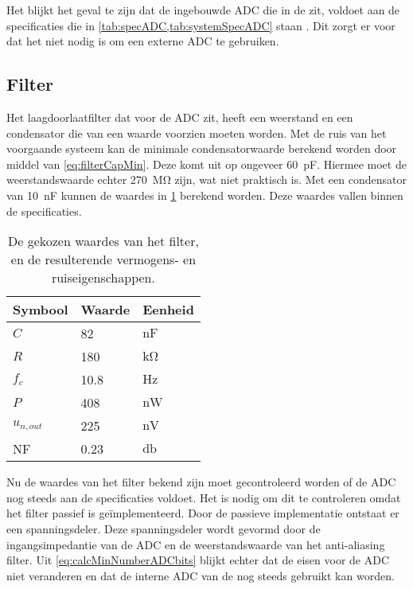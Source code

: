 Het blijkt het geval te zijn dat de ingebouwde ADC die in de \mcu  zit, voldoet aan de specificaties die in \cref{tab:specADC,tab:systemSpecADC} staan \cite{nrf52810}. Dit zorgt er voor dat het niet nodig is om een externe ADC te gebruiken.

\subsection{Filter}
Het laagdoorlaatfilter dat voor de ADC zit, heeft een weerstand en een condensator die van een waarde voorzien moeten worden.
Met de ruis van het voorgaande systeem kan de minimale condensatorwaarde berekend worden door middel van \cref{eq:filterCapMin}. Deze komt uit op ongeveer \qty{60}{\pico\farad}. Hiermee moet de weerstandswaarde echter \qty{270}{\mega\ohm} zijn, wat niet praktisch is. Met een condensator van \qty{10}{\nano\farad} kunnen de waardes in \cref{tab:filterValues} berekend worden. Deze waardes vallen binnen de specificaties.

\begin{table}[!htbp]
    \centering
    \begin{tabular}{l|l|l}
        Symbool & Waarde & Eenheid \\
        \hline
        $C$         & 82    & $\si{\nano\farad}$\\
        $R$         & 180   & $\si{\kilo\ohm}$  \\
        $f_c$       & 10.8  & $\si{\hertz}$     \\
        $P$         & 408   & $\si{\nano\watt}$ \\
        $u_{n,out}$ & 225   & $\si{\nano\volt}$ \\
        NF          & 0.23  & $\si{\decibel}$   \\
    \end{tabular}
    \caption{De gekozen waardes van het filter, en de resulterende vermogens- en ruiseigenschappen.}
    \label{tab:filterValues}
\end{table}

Nu de waardes van het filter bekend zijn moet gecontroleerd worden of de ADC nog steeds aan de specificaties voldoet. Het is nodig om dit te controleren omdat het filter passief is geïmplementeerd. Door de passieve implementatie ontstaat er een spanningsdeler. Deze spanningsdeler wordt gevormd door de ingangsimpedantie van de ADC en de weerstandswaarde van het anti-aliasing filter. Uit \cref{eq:calcMinNumberADCbits} blijkt echter dat de eisen voor de ADC niet veranderen en dat de interne ADC van de \mcu nog steeds gebruikt kan worden.


